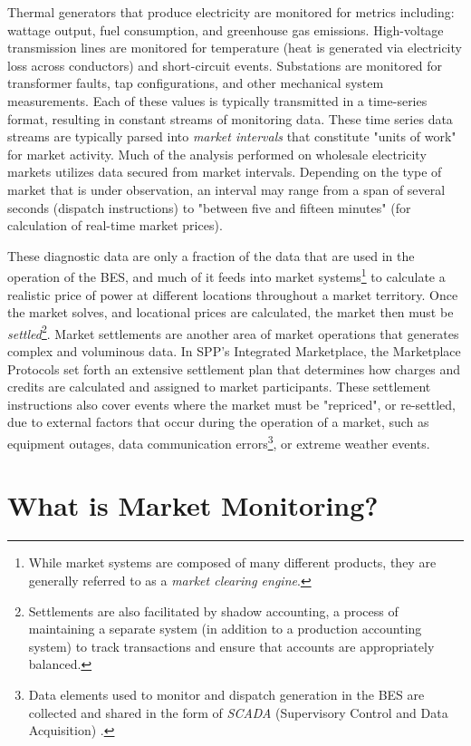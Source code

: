 Thermal generators that produce electricity are monitored for metrics including: wattage output, fuel consumption, and greenhouse gas emissions. High-voltage transmission lines are monitored for temperature (heat is generated via electricity loss across conductors) and short-circuit events. Substations are monitored for transformer faults, tap configurations, and other mechanical system measurements. Each of these values is typically transmitted in a time-series format, resulting in constant streams of monitoring data. These time series data streams are typically parsed into \textit{market intervals} that constitute "units of work" for market activity. Much of the analysis performed on wholesale electricity markets utilizes data secured from market intervals. Depending on the type of market that is under observation, an interval may range from a span of several seconds (dispatch instructions) to "between five and fifteen minutes" \cite{ferc1} (for calculation of real-time market prices). 

These diagnostic data are only a fraction of the data that are used in the operation of the BES, and much of it feeds into market systems\footnote{While market systems are composed of many different products, they are generally referred to as a \textit{market clearing engine}.} to calculate a realistic price of power at different locations throughout a market territory. Once the market solves, and locational prices are calculated, the market then must be \textit{settled}\footnote{Settlements are also facilitated by shadow accounting, a process of maintaining a separate system (in addition to a production accounting system) to track transactions and ensure that accounts are appropriately balanced.}. Market settlements are another area of market operations that generates complex and voluminous data. In SPP's Integrated Marketplace, the Marketplace Protocols set forth an extensive settlement plan that determines how charges and credits are calculated and assigned to market participants. These settlement instructions also cover events where the market must be "repriced", or re-settled, due to external factors that occur during the operation of a market, such as equipment outages, data communication errors\footnote{Data elements used to monitor and dispatch generation in the BES are collected and shared in the form of \textit{SCADA} (Supervisory Control and Data Acquisition) \cite{scada1}.}, or extreme weather events.

\section{What is Market Monitoring?}

